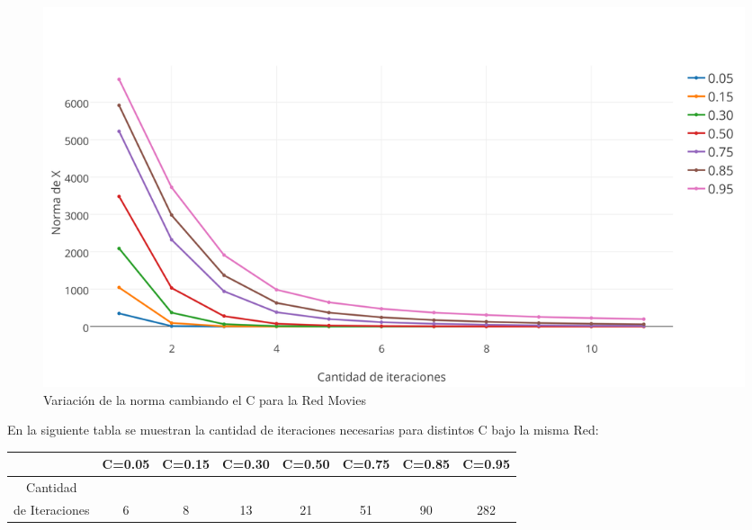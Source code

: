 \documentclass[a4paper]{article}
\begin{document}
\begin{figure}[h!]
  \begin{center}
	\includegraphics[scale=0.50]{imagenes/exp12/moviesPAGERANK.png}
	\caption{Variaci\'on de la norma cambiando el C para la Red Movies}
	\label{nombreparareferenciar}
  \end{center}
\end{figure}
En la siguiente tabla se muestran la cantidad de iteraciones necesarias para distintos C bajo la misma Red: \\
 \begin{tabular}[c]{|c|c|c|c|c|c|c|c|}
\hline
& C=0.05 & C=0.15 & C=0.30 & C=0.50 & C=0.75 & C=0.85 & C=0.95 \\
\hline
Cantidad &  & & & & & & \\ 
de Iteraciones & 6 & 8 & 13 & 21 & 51 & 90 & 282 \\
\hline
	\end{tabular}\\\\
\\
\end{document}
